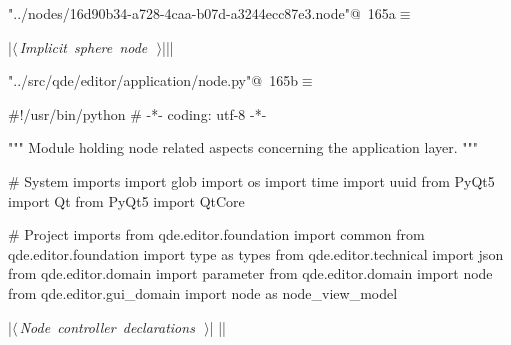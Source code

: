 \documentclass[%
    a4paper,    %
    justified,  %
    nobib,      %
    openany     %
]{tufte-book}
\begin{document}
\begin{flushleft} \small
\begin{minipage}{\linewidth}\label{scrap192}\raggedright\small
{} \verb@"../nodes/16d90b34-a728-4caa-b07d-a3244ecc87e3.node"@\nobreak\ {\footnotesize {165a}}$\equiv$
\vspace{-1ex}
\begin{pythoncode}
|\hbox{$\langle\,${\itshape Implicit sphere node}\nobreak\ {\footnotesize {}}$\,\rangle$}||\NWsep|
\end{pythoncode}
\vspace{1.5ex}
\footnotesize
\begin{list}{}{\setlength{\itemsep}{-\parsep}\setlength{\itemindent}{-\leftmargin}}

\item{}
\end{list}
\end{minipage}\vspace{4ex}
\end{flushleft}
\begin{flushleft} \small
\begin{minipage}{\linewidth}\label{scrap193}\raggedright\small
{} \verb@"../src/qde/editor/application/node.py"@\nobreak\ {\footnotesize {165b}}$\equiv$
\vspace{-1ex}
\begin{pythoncode}
#!/usr/bin/python
# -*- coding: utf-8 -*-

""" Module holding node related aspects concerning the application layer.
"""

# System imports
import glob
import os
import time
import uuid
from PyQt5 import Qt
from PyQt5 import QtCore

# Project imports
from qde.editor.foundation import common
from qde.editor.foundation import type as types
from qde.editor.technical  import json
from qde.editor.domain     import parameter
from qde.editor.domain     import node
from qde.editor.gui_domain import node as node_view_model


|\hbox{$\langle\,${\itshape Node controller declarations}\nobreak\ {\footnotesize {}}$\,\rangle$}|
|\NWsep|
\end{pythoncode}
\vspace{1.5ex}
\footnotesize
\begin{list}{}{\setlength{\itemsep}{-\parsep}\setlength{\itemindent}{-\leftmargin}}

\item{}
\end{list}
\end{minipage}\vspace{4ex}
\end{flushleft}
\end{document}
